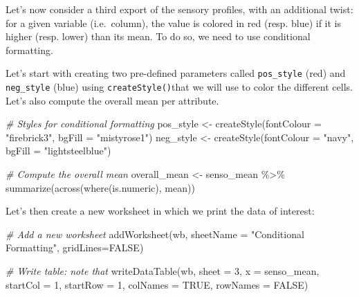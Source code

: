 \documentclass[
]{book}
\newenvironment{Shaded}{\begin{snugshade}}{\end{snugshade}}
\newcommand{\AttributeTok}[1]{\textcolor[rgb]{0.77,0.63,0.00}{#1}}
\newcommand{\CommentTok}[1]{\textcolor[rgb]{0.56,0.35,0.01}{\textit{#1}}}
\newcommand{\ConstantTok}[1]{\textcolor[rgb]{0.00,0.00,0.00}{#1}}
\newcommand{\DecValTok}[1]{\textcolor[rgb]{0.00,0.00,0.81}{#1}}
\newcommand{\FunctionTok}[1]{\textcolor[rgb]{0.00,0.00,0.00}{#1}}
\newcommand{\NormalTok}[1]{#1}
\newcommand{\OtherTok}[1]{\textcolor[rgb]{0.56,0.35,0.01}{#1}}
\newcommand{\SpecialCharTok}[1]{\textcolor[rgb]{0.00,0.00,0.00}{#1}}
\newcommand{\StringTok}[1]{\textcolor[rgb]{0.31,0.60,0.02}{#1}}
\begin{document}
Let's now consider a third export of the sensory profiles, with an additional twist: for a given variable (i.e.~column), the value is colored in red (resp. blue) if it is higher (resp. lower) than its mean. To do so, we need to use conditional formatting.

Let's start with creating two pre-defined parameters called \texttt{pos\_style} (red) and \texttt{neg\_style} (blue) using \texttt{createStyle()}that we will use to color the different cells. Let's also compute the overall mean per attribute.

\begin{Shaded}
\begin{Highlighting}[]
\CommentTok{\# Styles for conditional formatting}
\NormalTok{pos\_style }\OtherTok{\textless{}{-}} \FunctionTok{createStyle}\NormalTok{(}\AttributeTok{fontColour =} \StringTok{"firebrick3"}\NormalTok{, }\AttributeTok{bgFill =} \StringTok{"mistyrose1"}\NormalTok{)}
\NormalTok{neg\_style }\OtherTok{\textless{}{-}} \FunctionTok{createStyle}\NormalTok{(}\AttributeTok{fontColour =} \StringTok{"navy"}\NormalTok{, }\AttributeTok{bgFill =} \StringTok{"lightsteelblue"}\NormalTok{)}

\CommentTok{\# Compute the overall mean}
\NormalTok{overall\_mean }\OtherTok{\textless{}{-}}\NormalTok{ senso\_mean }\SpecialCharTok{\%\textgreater{}\%} 
  \FunctionTok{summarize}\NormalTok{(}\FunctionTok{across}\NormalTok{(}\FunctionTok{where}\NormalTok{(is.numeric), mean))}
\end{Highlighting}
\end{Shaded}

Let's then create a new worksheet in which we print the data of interest:

\begin{Shaded}
\begin{Highlighting}[]
\CommentTok{\# Add a new worksheet}
\FunctionTok{addWorksheet}\NormalTok{(wb, }\AttributeTok{sheetName =} \StringTok{"Conditional Formatting"}\NormalTok{, }\AttributeTok{gridLines=}\ConstantTok{FALSE}\NormalTok{)}

\CommentTok{\# Write table: note that }
\FunctionTok{writeDataTable}\NormalTok{(wb,}
               \AttributeTok{sheet =} \DecValTok{3}\NormalTok{,}
               \AttributeTok{x =}\NormalTok{ senso\_mean, }
               \AttributeTok{startCol =} \DecValTok{1}\NormalTok{,}
               \AttributeTok{startRow =} \DecValTok{1}\NormalTok{,}
               \AttributeTok{colNames =} \ConstantTok{TRUE}\NormalTok{, }\AttributeTok{rowNames =} \ConstantTok{FALSE}\NormalTok{)}
\end{Highlighting}
\end{Shaded}
\end{document}
